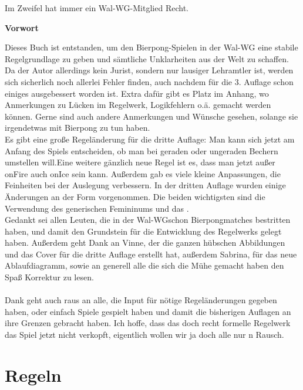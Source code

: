\documentclass[a5paper, 12pt]{book}
\begin{document}
\begin{center}
\vspace*{2.5cm}
\par
\smallskip
\large{Im Zweifel hat immer ein Wal-WG\texttrademark-Mitglied Recht.}
\end{center}
\restoregeometry
\pagebreak
\begin{Large} \textbf{Vorwort\\}
\end{Large}
Dieses Buch ist entstanden, um den Bierpong-Spielen in der Wal-WG eine stabile Regelgrundlage zu geben und sämtliche Unklarheiten aus der Welt zu schaffen. Da der Autor allerdings kein Jurist, sondern nur lausiger Lehramtler ist, werden sich sicherlich noch allerlei Fehler finden, auch nachdem für die 3. Auflage schon einiges ausgebessert worden ist. Extra dafür gibt es Platz im Anhang, wo Anmerkungen zu Lücken im Regelwerk, Logikfehlern o.ä. gemacht werden können. Gerne sind auch andere Anmerkungen und Wünsche gesehen, solange sie irgendetwas mit Bierpong zu tun haben.\\
Es gibt eine große Regeländerung für die dritte Auflage: Man kann sich jetzt am Anfang des Spiels entscheiden, ob man bei geraden oder ungeraden Bechern umstellen will.Eine weitere gänzlich neue Regel ist es, dass man jetzt außer onFire auch onIce sein kann. Außerdem gab es viele kleine Anpassungen, die Feinheiten bei der Auslegung verbessern.
In der dritten Auflage wurden einige Änderungen an der Form vorgenommen. Die beiden wichtigsten sind die Verwendung des generischen Femininums und das \texttrademark.\\
Gedankt sei allen Leuten, die in der Wal-WG\texttrademark schon Bierpongmatches bestritten haben, und damit den Grundstein für die Entwicklung des Regelwerks gelegt haben. Außerdem geht Dank an Vinne, der die ganzen hübschen Abbildungen und das Cover für die dritte Auflage erstellt hat, außerdem Sabrina, für das neue Ablaufdiagramm, sowie an generell alle die sich die Mühe gemacht haben den Spaß Korrektur zu lesen.\\\\
Dank geht auch raus an alle, die Input für nötige Regeländerungen gegeben haben, oder einfach Spiele gespielt haben und damit die bisherigen Auflagen an ihre Grenzen gebracht haben.
Ich hoffe, dass das doch recht formelle Regelwerk das Spiel jetzt nicht verkopft, eigentlich wollen wir ja doch alle nur n Rausch.

\tableofcontents
\cleardoublepage
{}
\part {Regeln}
\end{document}
